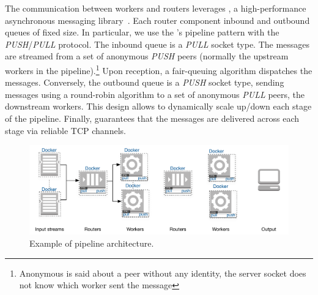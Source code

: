The communication between workers and routers leverages \zmq, a high-performance asynchronous messaging library~\cite{zero_mq}.
Each router component inbound and outbound queues of fixed size.
In particular, we use the \zmq's pipeline pattern with the \emph{PUSH}/\emph{PULL} protocol\cite{zero_mq:pipeline}.
The inbound queue is a \emph{PULL} socket type.
The messages are streamed from a set of anonymous \emph{PUSH} peers (normally the upstream workers in the pipeline).\footnote{Anonymous is said about a peer without any identity, the server socket does not know which worker sent the message}
Upon reception, a fair-queuing algorithm dispatches the messages.
Conversely, the outbound queue is a \emph{PUSH} socket type, sending messages using a round-robin algorithm to a set of anonymous \emph{PULL} peers, the downstream workers.
This design allows to dynamically scale up/down each stage of the pipeline. %
Finally, \zmq guarantees that the messages are delivered across each stage via reliable TCP channels.

\begin{figure}
  \centering
  \includegraphics[scale=0.7]{images/architecture_pipeline}
  \caption{Example of \SYS pipeline architecture.}
  \label{fig:architecture_pipeline}
\end{figure}

